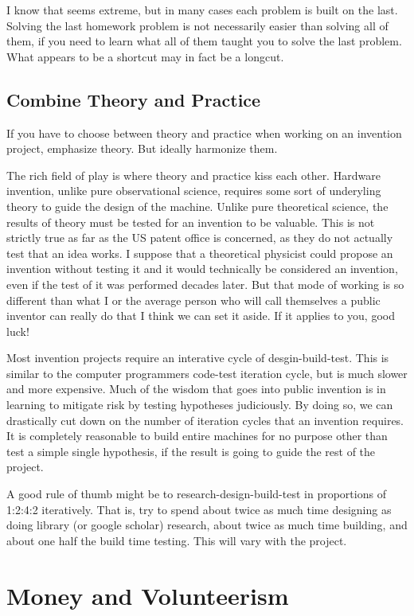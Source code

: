 \documentclass[
	fontsize=10pt, %
	twoside=false, %
	secnumdepth=1, %
]{kaobook}
\begin{document}
I know that seems extreme, but in many cases each problem is built on the last.
Solving the last homework problem is not necessarily easier than solving all of them,
if you need to learn what all of them taught you to solve the last problem.
What appears to be a shortcut may in fact be a longcut.

\section{Combine Theory and Practice}

If you have to choose between theory and practice when
working on an invention project, emphasize theory.
But ideally harmonize them.

The rich field of play is where theory and practice
kiss each other.
Hardware invention, unlike pure observational science,
requires some sort of underyling theory to guide
the design of the machine.
Unlike pure theoretical science, the results
of theory must be tested for an invention to be valuable.
This is not strictly true as far as the US patent office
is concerned, as they do not actually test that an idea
works.
I suppose that a theoretical physicist could propose an
invention without testing it and it would technically be considered
an invention, even if the test of it was performed decades later.
But that mode of working is so different than what
I or the average person who will call themselves a public inventor
can really do that I think we can set it aside. If it applies
to you, good luck!

Most invention projects require an interative cycle of
desgin-build-test.
This is similar to the computer programmers code-test iteration
cycle, but is much slower and more expensive.
Much of the wisdom that goes into public invention is in
learning to mitigate risk by testing hypotheses judiciously.
By doing so, we can drastically cut down on the number of
iteration cycles that an invention requires.
It is completely reasonable to build entire machines
for no purpose other than test a simple single hypothesis, if
the result is going to guide the rest of the project.

A good rule of thumb might be to research-design-build-test
in proportions of 1:2:4:2 iteratively. That is,
try to spend about twice as much time designing as doing
library (or google scholar) research, about twice as much
time building, and about one half the build time testing.
This will vary with the project.


\chapter{Money and Volunteerism}
\end{document}
